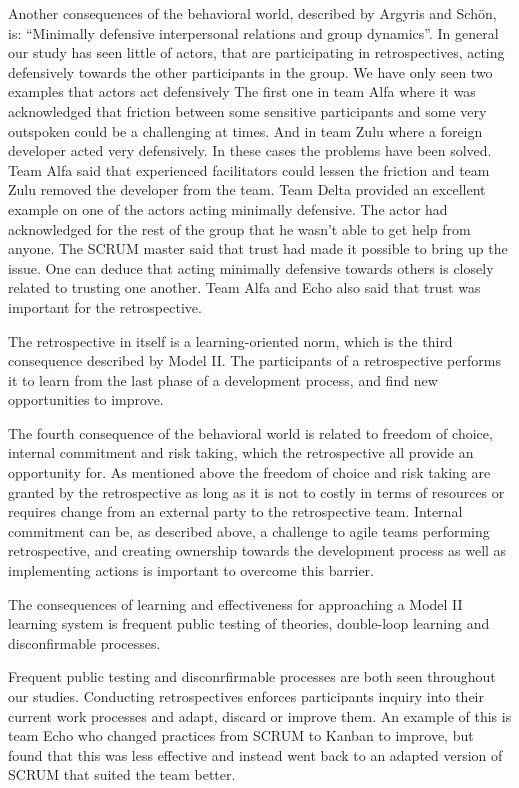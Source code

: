 Another consequences of the behavioral world, described by Argyris and Schön, is: ``Minimally defensive interpersonal relations and group dynamics''. In general our study has seen little of actors, that are participating in retrospectives, acting defensively towards the other participants in the group. We have only seen two examples that actors act defensively The first one in team Alfa where it was acknowledged that friction between some sensitive participants and some very outspoken could be a challenging at times. And in team Zulu where a foreign developer acted very defensively. In these cases the problems have been solved. Team Alfa said that experienced facilitators could lessen the friction and team Zulu removed the developer from the team. Team Delta provided an excellent example on one of the actors acting minimally defensive. The actor had acknowledged for the rest of the group that he wasn't able to get help from anyone. The SCRUM master said that trust had made it possible to bring up the issue. One can deduce that acting minimally defensive towards others is closely related to trusting one another. Team Alfa and Echo also said that trust was important for the retrospective. 

The retrospective in itself is a learning-oriented norm, which is the third consequence described by Model II. The participants of a retrospective performs it to learn from the last phase of a development process, and find new opportunities to improve. 

The fourth consequence of the behavioral world is related to freedom of choice, internal commitment and risk taking, which the retrospective all provide an opportunity for. As mentioned above the freedom of choice and risk taking are granted by the retrospective as long as it is not to costly in terms of resources or requires change from an external party to the retrospective team. Internal commitment can be, as described above, a challenge to agile teams performing retrospective, and creating ownership towards the development process as well as implementing actions is important to overcome this barrier.  

The consequences of learning and effectiveness for approaching a Model II learning system is frequent public testing of theories, double-loop learning and disconfirmable processes. 

Frequent public testing and disconrfirmable processes are both seen throughout our studies. Conducting retrospectives enforces participants inquiry into their current work processes and adapt, discard or improve them. An example of this is team Echo who changed practices from SCRUM to Kanban to improve, but found that this was less effective and instead went back to an adapted version of SCRUM that suited the team better. 

